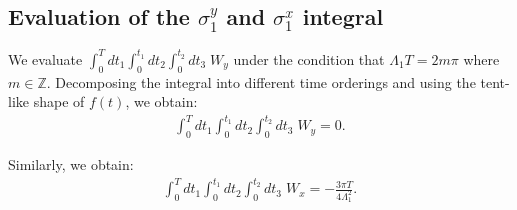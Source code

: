 \documentclass[aps,prb,reprint,twocolumn,amsmath,amssymb,citeautoscript]{revtex4-2}
\begin{document}

\subsection{Evaluation of the $\sigma_1^y$  and $\sigma_1^x$ integral}
\label{app:edge:x_integral}

We evaluate $\int_0^T\!dt_1\!\int_0^{t_1}\!dt_2\!\int_0^{t_2}\!dt_3\;
W_y$ under the condition that $\Lambda_1T = 2m\pi$ where $m\in\mathbb Z$. Decomposing the integral into different time orderings and using the tent-like shape of $f(t)$, we obtain:
\begin{align}
    \int_0^T\!dt_1\!\int_0^{t_1}\!dt_2\!\int_0^{t_2}\!dt_3\; W_y = 0.
\end{align}

Similarly, we obtain: 
\begin{align}
    \int_0^T\!dt_1\!\int_0^{t_1}\!dt_2\!\int_0^{t_2}\!dt_3\; W_x = -\frac{3\pi T}{4\Lambda_1^2}.
\end{align}
\end{document}
